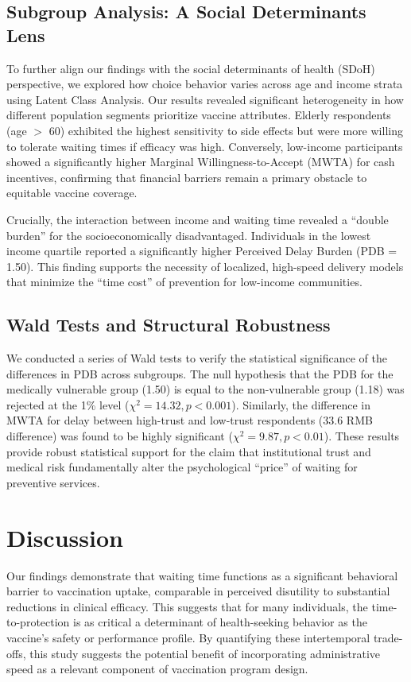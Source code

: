 \documentclass[preprint,12pt,authoryear]{elsarticle}
\begin{document}
\subsection{Subgroup Analysis: A Social Determinants Lens}
To further align our findings with the social determinants of health (SDoH) perspective, we explored how choice behavior varies across age and income strata using Latent Class Analysis. Our results revealed significant heterogeneity in how different population segments prioritize vaccine attributes. Elderly respondents (age $>$ 60) exhibited the highest sensitivity to side effects but were more willing to tolerate waiting times if efficacy was high. Conversely, low-income participants showed a significantly higher Marginal Willingness-to-Accept (MWTA) for cash incentives, confirming that financial barriers remain a primary obstacle to equitable vaccine coverage.

Crucially, the interaction between income and waiting time revealed a ``double burden'' for the socioeconomically disadvantaged. Individuals in the lowest income quartile reported a significantly higher Perceived Delay Burden (PDB = 1.50). This finding supports the necessity of localized, high-speed delivery models that minimize the ``time cost'' of prevention for low-income communities.

\subsection{Wald Tests and Structural Robustness}
We conducted a series of Wald tests to verify the statistical significance of the differences in PDB across subgroups. The null hypothesis that the PDB for the medically vulnerable group (1.50) is equal to the non-vulnerable group (1.18) was rejected at the 1\% level ($\chi^2 = 14.32, p < 0.001$). Similarly, the difference in MWTA for delay between high-trust and low-trust respondents (33.6 RMB difference) was found to be highly significant ($\chi^2 = 9.87, p < 0.01$). These results provide robust statistical support for the claim that institutional trust and medical risk fundamentally alter the psychological ``price'' of waiting for preventive services.

\section{Discussion}
Our findings demonstrate that waiting time functions as a significant behavioral barrier to vaccination uptake, comparable in perceived disutility to substantial reductions in clinical efficacy. This suggests that for many individuals, the time-to-protection is as critical a determinant of health-seeking behavior as the vaccine's safety or performance profile. By quantifying these intertemporal trade-offs, this study suggests the potential benefit of incorporating administrative speed as a relevant component of vaccination program design.
\end{document}
